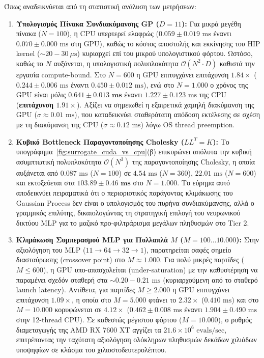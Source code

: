 Όπως αναδεικνύεται από τη στατιστική ανάλυση των μετρήσεων:
\begin{enumerate}
    \item \textbf{Υπολογισμός Πίνακα Συνδιακύμανσης GP ($D=11$):} Για μικρά μεγέθη πίνακα ($N=100$), η CPU υπερτερεί ελαφρώς ($0.059 \pm 0.019\text{ ms}$ έναντι $0.070 \pm 0.000\text{ ms}$ στη GPU), καθώς το κόστος αποστολής και εκκίνησης του HIP kernel ($\sim 20-30\ \mu\text{s}$) κυριαρχεί επί του μικρού υπολογιστικού φόρτου. Ωστόσο, καθώς το $N$ αυξάνεται, η υπολογιστική πολυπλοκότητα $\mathcal{O}(N^2 \cdot D)$ καθιστά την εργασία compute-bound. Στο $N=600$ η GPU επιτυγχάνει επιτάχυνση $1.84\times$ ($0.244 \pm 0.006\text{ ms}$ έναντι $0.450 \pm 0.012\text{ ms}$), ενώ στο $N=1.000$ ο χρόνος της GPU είναι μόλις $\mathbf{0.641 \pm 0.013\text{ ms}}$ έναντι $1.227 \pm 0.123\text{ ms}$ της CPU (\textbf{επιτάχυνση $1.91\times$}). Αξίζει να σημειωθεί η εξαιρετικά χαμηλή διακύμανση της GPU ($\sigma \approx 0.01\text{ ms}$), που καταδεικνύει σταθερότατη απόδοση εκτέλεσης σε σχέση με τη διακύμανση της CPU ($\sigma \approx 0.12\text{ ms}$) λόγω OS thread preemption.
    \item \textbf{Κυβικό Bottleneck Παραγοντοποίησης Cholesky ($LL^T = K$):} Το υπογράφημα~\ref{fig:surrogate_cuda_vs_cpu}(β) επικυρώνει απόλυτα την κυβική ασυμπτωτική πολυπλοκότητα $\mathcal{O}(N^3)$ της παραγοντοποίησης Cholesky, η οποία αυξάνεται από $0.087\text{ ms}$ ($N=100$) σε $4.54\text{ ms}$ ($N=360$), $22.01\text{ ms}$ ($N=600$) και εκτοξεύεται στα $\mathbf{103.89 \pm 0.46\text{ ms}}$ στο $N=1.000$. Το εύρημα αυτό αποδεικνύει πειραματικά ότι ο περιοριστικός παράγοντας κλιμάκωσης του Gaussian Process δεν είναι ο υπολογισμός του πυρήνα συνδιακύμανσης, αλλά ο γραμμικός επιλύτης, δικαιολογώντας τη στρατηγική επιλογή του νευρωνικού δικτύου MLP για το μαζικό προ-φιλτράρισμα μεγάλων πληθυσμών στο Tier 2.
    \item \textbf{Κλιμάκωση Συμπερασμού MLP για Πολλαπλά $M$ ($M=100\dots 10.000$):} Στην αξιολόγηση του MLP ($11 \to 64 \to 32 \to 1$), παρατηρείται σαφές σημείο διασταύρωσης (crossover point) στο $M \approx 1.000$. Για πολύ μικρές παρτίδες ($M \le 600$), η GPU υπο-απασχολείται (under-saturation) με την καθυστέρηση να παραμένει σχεδόν σταθερή στα $\sim 0.20-0.21\text{ ms}$ (κυριαρχούμενη από το σταθερό launch latency). Αντίθετα, για παρτίδες $M \ge 2.000$ η GPU επιτυγχάνει επιτάχυνση $1.09\times$, η οποία στο $M=5.000$ φτάνει το $2.32\times$ ($0.410\text{ ms}$) και στο $M=10.000$ κορυφώνεται σε \textbf{$4.12\times$} ($0.462 \pm 0.008\text{ ms}$ έναντι $1.904 \pm 0.490\text{ ms}$ στην 12-thread CPU). Σε καθεστώς μέγιστου φόρτου ($M=10.000$), ο ρυθμός διαμεταγωγής της AMD RX 7600 XT αγγίζει τα \textbf{$21.6 \times 10^6\text{ evals/sec}$}, επιτρέποντας την ταχύτατη αξιολόγηση ολόκληρων πληθυσμών δεκάδων χιλιάδων υποψηφίων σε κλάσμα του χιλιοστοδευτερολέπτου.
\end{enumerate}
